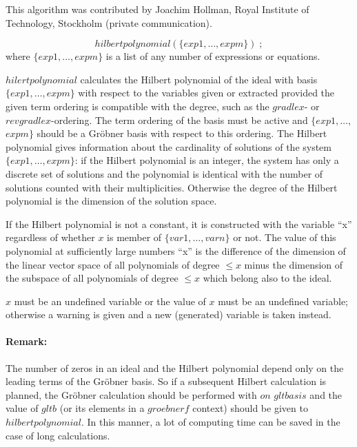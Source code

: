 This algorithm was contributed by {\sc Joachim Hollman}, Royal
Institute of Technology, Stockholm (private communication).

\[
hilbertpolynomial (\{exp1, \ldots , expm\})\;;
\]
where $\{exp1, \ldots , expm\}$ is a list of any number of expressions
or equations.

$hilertpolynomial$ calculates the Hilbert polynomial of the ideal
with basis $\{exp1, \ldots , expm\}$ with respect to the
variables given or extracted provided the given term ordering is
compatible with the degree, such as the $gradlex$- or $revgradlex$-ordering.
The term ordering of the basis
must be active and $\{exp1, \ldots$, $ expm\}$ should be a
Gr\"obner basis with respect to this ordering. The Hilbert polynomial
gives information about the cardinality of solutions of the system
$\{exp1, \ldots , expm\}$: if the Hilbert polynomial is an
integer, the system has only a discrete set of solutions and the
polynomial is identical with the number of solutions counted with
their multiplicities. Otherwise the degree of the Hilbert
polynomial is the dimension of the solution space.

If the Hilbert polynomial is not a constant, it is constructed with the
variable ``x'' regardless of whether $x$ is member of
$\{var1, \ldots , varn\}$ or not. The value of this polynomial at
sufficiently large numbers  ``x'' is the difference
of the dimension of the linear vector space of all polynomials of degree
$ \leq x $ minus the dimension of the subspace of all polynomials of
degree $\leq x $ which belong also to the ideal.

$x$ must be an undefined variable or the value of $x$ must be an undefined
variable; otherwise a warning is given and a new (generated) variable
is taken instead.
 
\paragraph{Remark:} The number of zeros in an ideal and the
Hilbert polynomial depend only on the leading terms of the
Gr\"obner basis. So if a subsequent Hilbert calculation is planned, the
Gr\"obner calculation should be performed with $on$ $gltbasis$ and
the value of $gltb$ (or its elements in a $groebnerf$ context) should be
given to $hilbertpolynomial$. In this manner, a lot of computing time can be
saved in the case of long calculations.

